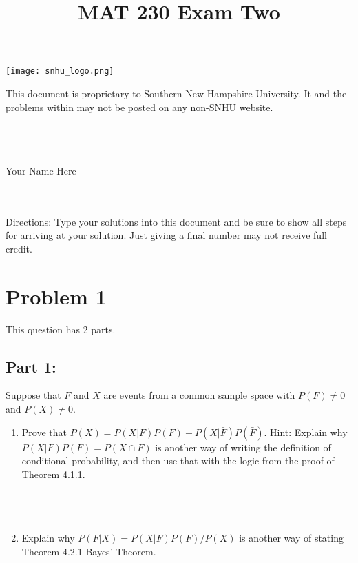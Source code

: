 \documentclass{amsart}
\theoremstyle{definition}
\theoremstyle{Exercise}
\theoremstyle{remark}
\theoremstyle{rule}
\numberwithin{equation}{section}
\begin{document}
\title{\sf MAT 230 Exam Two}%





\begin{center}
\texttt{[image: snhu\_logo.png]}
\end{center}

\maketitle
This document is proprietary to Southern New Hampshire University. It and the problems within may not be posted on any non-SNHU website.\\\\\\\\
\begin{center}
Your Name Here
\end{center}

\begin{center}
\rule{\textwidth}{0.4pt}
\end{center}
\newpage
\section*{}
\section*{}
Directions: Type your solutions into this document and be sure to show all steps for arriving at your solution. Just giving a final number may not receive full credit.
\\
\section*{Problem 1}
 \noindent
 This question has 2 parts.
 \subsection*{Part 1:}
 Suppose that $F$ and $X$ are events from a common sample space with $P(F) \neq 0$ and $P(X) \neq 0$.
 \\
 \begin{enumerate}[label=(\alph*)]
     \item Prove that $P(X) = P(X|F)P(F) + P(X|\bar{F})P(\bar{F})$. Hint: Explain why $P(X|F)P(F) = P(X \cap F)$ is another way of writing the definition of conditional probability, and then use that with the logic from the proof of Theorem 4.1.1.
     \\\\
     \\\\
     \item Explain why $P(F|X) = P(X|F)P(F)/P(X)$ is another way of stating Theorem 4.2.1 Bayes’ Theorem.
     \\\\
     \\\\
 \end{enumerate}
\end{document}
